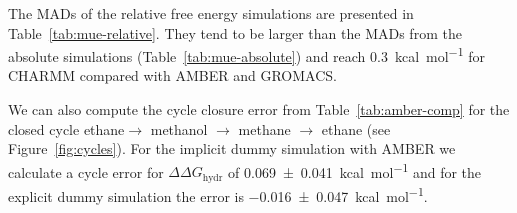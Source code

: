 \documentclass[journal=jctcce,manuscript=article]{achemso}
\begin{document}
The MADs of the relative free energy simulations are presented in 
Table~\ref{tab:mue-relative}.  They tend to be larger than the MADs from 
the absolute simulations (Table~\ref{tab:mue-absolute}) and reach 
\SI{0.3}{kcal.mol^{-1}} for CHARMM compared with AMBER and GROMACS.
\begin{table}[]
  \begin{minipage}{\linewidth}
    \caption{MAD (in \si{kcal.mol^{-1}}) comparing relative free energies from 
      relative simulations between SOMD, GROMACS, AMBER and 
      CHARMM.}\label{tab:mue-relative}
  \end{minipage}
\end{table}

We can also compute the cycle closure error from Table~\ref{tab:amber-comp} for 
the closed cycle ethane$ \rightarrow$ methanol $\rightarrow$ methane 
$\rightarrow$ ethane (see Figure~\ref{fig:cycles}). For the implicit dummy 
simulation with AMBER we calculate a cycle error for $\Delta\Delta 
G_\mathrm{hydr}$ of \SI{0.069+-0.041}{kcal.mol^{-1}} and for the explicit dummy 
simulation the error is \SI{-0.016+-0.047}{kcal.mol^{-1}}.
\end{document}

